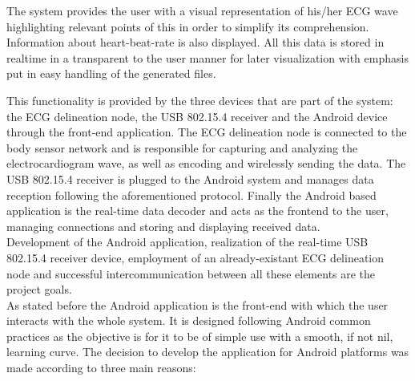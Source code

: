		The system provides the user with a visual representation of his/her ECG wave highlighting relevant points of this in order to simplify its comprehension. Information about heart-beat-rate %
		is also displayed. All this data is stored in realtime in a transparent to the user manner for later visualization with emphasis put in easy handling of the generated files.\\

		\begin{comment}
		¿Qué es cada parte?
		Sistema 3 partes: nodo delineador, receptor 802.15.4 y app como frontend en general. En un parrafo distino para cada una explicar las tecnologías que hemos usado y porque. 

		¿Cómo se hizo cada parte?
		(Orden, android ->shimmer->msp430->dirigir texto hacia investigación(flecha = parrafo))
		Visualizador: Android ampliamente usado, facilidad para obtener un dispositivo, no demasiado coste (al menos < iOS), plataforma abierta, desarrollo comodo.
		Shimmer: reutiliza sistema desarrollado por la complu en colaboración con EPFL
		Receptor: 

		\end{comment}
		This functionality is provided by the three devices that are part of the system: the ECG delineation node, the USB 802.15.4 receiver and the Android device through the front-end application. The ECG delineation node is connected to the body sensor network and is responsible for capturing and analyzing the electrocardiogram wave, as well as encoding and wirelessly sending the data. The USB 802.15.4 receiver is plugged to the Android system and manages data reception following the aforementioned protocol. Finally the Android based application is the real-time data decoder and acts as the frontend to the user, managing connections and storing and displaying received data.\\

		Development of the Android application, realization of the real-time USB 802.15.4 receiver device, employment of an already-existant ECG delineation node and successful intercommunication between all these elements are the project goals.\\
		
		As stated before the Android application is the front-end with which the user interacts with the whole system. It is designed following Android common practices as the objective is for it to be of simple use with a smooth, if not nil, learning curve. The decision to develop the application for Android platforms was made according to three main reasons:\\


